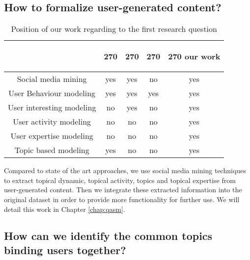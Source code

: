 \subsection{How to formalize user-generated content?}
    
    \begin{table}[htp]
        \centering
        \begin{tabular}{c c c c c}
        &
        \begin{turn}{270}
            \cite{chp2socialsemanticminingDBLP:series/synthesis/2015Omitola} \end{turn} 
        &
        \begin{turn}{270} 
            \cite{chp2siocontoDBLP:conf/atal/PassantBBD09}
        \end{turn}
        &
        \begin{turn}{270} 
            \cite{chp2usermodelingplumbaum2015user}
        \end{turn}
        &
        \begin{turn}{270}
        our work
        \end{turn}
        \\ \hline
        Social media mining & yes & yes & no & yes \\ \hline
        User Behaviour modeling & yes & yes & yes &yes \\ \hline
        User interesting modeling & no &yes & no & yes\\ \hline
        User activity modeling & no & no & no & yes\\ \hline
        User expertise modeling & no & no & no & yes \\ \hline
        Topic based modeling & yes & no & no &yes \\ \hline
        \end{tabular}
        \caption{Position of our work regarding to the first research question}
        \label{tab:rq1compare}
    \end{table}
Compared to state of the art approaches, we use social media mining techniques to extract topical dynamic, topical activity, topics and topical expertise from user-generated content. Then we integrate these extracted information into the original dataset in order to provide more functionality for further use. We will detail this work in Chapter \ref{chap:qasm}. 
    


\subsection{How can we identify the common topics binding users together?}
    

